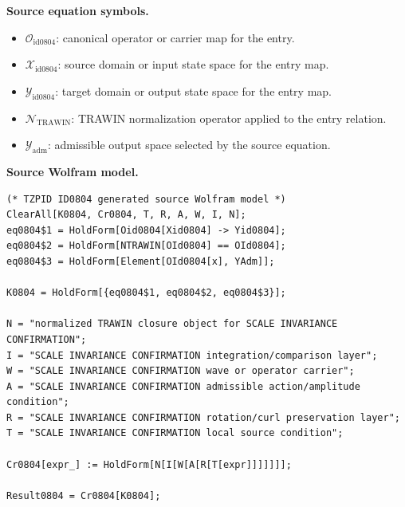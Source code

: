 \begin{minipage}[t]{0.49\linewidth}
\begingroup
\small
\raggedright
\textbf{Source equation symbols.}\par
\begin{itemize}[leftmargin=1.35em,itemsep=1pt,topsep=1pt,parsep=0pt]
    \item $\mathcal{O}_{\mathrm{id0804}}$: canonical operator or carrier map for the entry.
    \item $\mathcal{X}_{\mathrm{id0804}}$: source domain or input state space for the entry map.
    \item $\mathcal{Y}_{\mathrm{id0804}}$: target domain or output state space for the entry map.
    \item $\mathcal{N}_{\mathrm{TRAWIN}}$: TRAWIN normalization operator applied to the entry relation.
    \item $\mathcal{Y}_{\mathrm{adm}}$: admissible output space selected by the source equation.
\end{itemize}
\endgroup
\end{minipage}\hfill
\begin{minipage}[t]{0.47\linewidth}
\begingroup
\scriptsize
\raggedright
\textbf{Source Wolfram model.}\par
\begin{Verbatim}[fontsize=\tiny,breaklines=true,breakanywhere=true]
(* TZPID ID0804 generated source Wolfram model *)
ClearAll[K0804, Cr0804, T, R, A, W, I, N];
eq0804$1 = HoldForm[Oid0804[Xid0804] -> Yid0804];
eq0804$2 = HoldForm[NTRAWIN[OId0804] == OId0804];
eq0804$3 = HoldForm[Element[OId0804[x], YAdm]];

K0804 = HoldForm[{eq0804$1, eq0804$2, eq0804$3}];

N = "normalized TRAWIN closure object for SCALE INVARIANCE CONFIRMATION";
I = "SCALE INVARIANCE CONFIRMATION integration/comparison layer";
W = "SCALE INVARIANCE CONFIRMATION wave or operator carrier";
A = "SCALE INVARIANCE CONFIRMATION admissible action/amplitude condition";
R = "SCALE INVARIANCE CONFIRMATION rotation/curl preservation layer";
T = "SCALE INVARIANCE CONFIRMATION local source condition";

Cr0804[expr_] := HoldForm[N[I[W[A[R[T[expr]]]]]]];

Result0804 = Cr0804[K0804];
\end{Verbatim}
\endgroup
\end{minipage}

